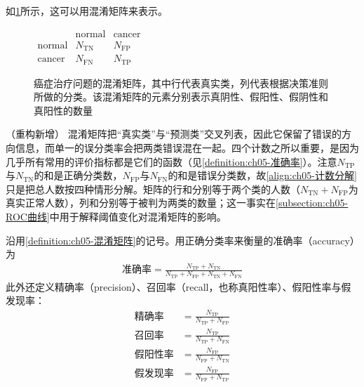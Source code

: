\documentclass[../../main.tex]{subfiles}
\begin{document}
如\cref{figure:ch05-混淆矩阵}所示，这可以用混淆矩阵来表示。

\begin{figure}[htbp]
  \centering
  $\begin{array}{c|cc}
    & \text{normal} & \text{cancer}\\\hline
    \text{normal} & N_{\mathrm{TN}} & N_{\mathrm{FP}}\\
    \text{cancer} & N_{\mathrm{FN}} & N_{\mathrm{TP}}
  \end{array}$
  \caption{癌症治疗问题的混淆矩阵，其中行代表真实类，列代表根据决策准则所做的分类。该混淆矩阵的元素分别表示真阴性、假阳性、假阴性和真阳性的数量}
  \label{figure:ch05-混淆矩阵}
\end{figure}

\begin{remark}（重构新增）
混淆矩阵把“真实类”与“预测类”交叉列表，因此它保留了错误的方向信息，而单一的误分类率会把两类错误混在一起。四个计数之所以重要，是因为几乎所有常用的评价指标都是它们的函数（见\cref{definition:ch05-准确率}）。注意$N_{\mathrm{TP}}$与$N_{\mathrm{TN}}$的和是正确分类数，$N_{\mathrm{FP}}$与$N_{\mathrm{FN}}$的和是错误分类数，故\eqref{align:ch05-计数分解}只是把总人数按四种情形分解。矩阵的行和分别等于两个类的人数（$N_{\mathrm{TN}}+N_{\mathrm{FP}}$为真实正常人数），列和分别等于被判为两类的数量；这一事实在\cref{subsection:ch05-ROC曲线}中用于解释阈值变化对混淆矩阵的影响。
\end{remark}

\begin{definition}\label{definition:ch05-准确率}
沿用\cref{definition:ch05-混淆矩阵}的记号。用正确分类率来衡量的准确率（accuracy）为
\begin{align}
  \text{准确率}=\frac{N_{\mathrm{TP}}+N_{\mathrm{TN}}}{N_{\mathrm{TP}}+N_{\mathrm{FP}}+N_{\mathrm{TN}}+N_{\mathrm{FN}}}
  \label{align:ch05-准确率}
\end{align}
此外还定义精确率（precision）、召回率（recall，也称真阳性率）、假阳性率与假发现率：
\begin{align}
  \text{精确率}&=\frac{N_{\mathrm{TP}}}{N_{\mathrm{TP}}+N_{\mathrm{FP}}}
  \label{align:ch05-精确率}\\
  \text{召回率}&=\frac{N_{\mathrm{TP}}}{N_{\mathrm{TP}}+N_{\mathrm{FN}}}
  \label{align:ch05-召回率}\\
  \text{假阳性率}&=\frac{N_{\mathrm{FP}}}{N_{\mathrm{FP}}+N_{\mathrm{TN}}}
  \label{align:ch05-假阳性率}\\
  \text{假发现率}&=\frac{N_{\mathrm{FP}}}{N_{\mathrm{FP}}+N_{\mathrm{TP}}}
  \label{align:ch05-假发现率}
\end{align}
\end{definition}
\end{document}
